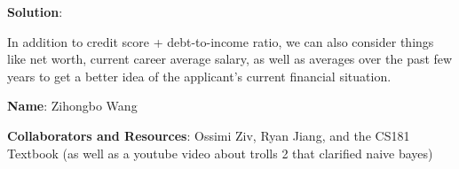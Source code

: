 \documentclass[submit]{../harvardml}
\newenvironment{solution}{
    \vspace{2mm}
    \color{blue}\noindent\textbf{Solution}:
}{}
\begin{document}
\begin{solution}
\begin{itemize}
  In addition to credit score + debt-to-income ratio, we can also consider things like net worth, current career average salary, as well as averages over the past few years to get a better idea of the applicant's current financial situation. 
  \end{itemize}
\end{solution}
\newpage
\newpage

\textbf{Name}: Zihongbo Wang

\textbf{Collaborators and Resources}: Ossimi Ziv, Ryan Jiang, and the CS181 Textbook (as well as a youtube video about trolls 2 that clarified naive bayes)
\end{document}
